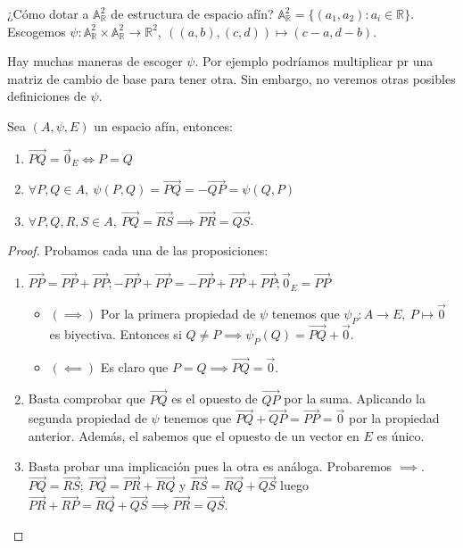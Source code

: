 \documentclass[14pt]{book}
\begin{document}
\begin{ej}
	¿Cómo dotar a $\mathbb{A}^2_\mathbb{R}$ de estructura de espacio afín? $\mathbb{A}^2_\mathbb{R} = \{(a_1, a_2) : a_i \in \mathbb{R}\}$. Escogemos $\psi : \mathbb{A}^2_\mathbb{R} \times \mathbb{A}^2_\mathbb{R} \to \mathbb{R}^2,\ ((a,b), (c,d)) \mapsto (c-a, d-b)$.
	
	Hay muchas maneras de escoger $\psi$. Por ejemplo podríamos multiplicar pr una matriz de cambio de base para tener otra. Sin embargo, no veremos otras posibles definiciones de $\psi$.
\end{ej}

\begin{pro}
	Sea $(A, \psi, E)$ un espacio afín, entonces:
	\begin{enumerate}
		\item $\overrightarrow{P Q} = \overrightarrow{0}_E \iff P = Q$
		\item $\forall P, Q \in A,\ \psi(P, Q) = \overrightarrow{P Q} = - \overrightarrow{Q P} = \psi(Q, P)$
		\item $\forall P, Q, R, S \in A,\ \overrightarrow{PQ} = \overrightarrow{RS} \implies \overrightarrow{PR} = \overrightarrow{QS}$.
	\end{enumerate}
\end{pro}

\begin{proof}
	Probamos cada una de las proposiciones:
	\begin{enumerate}
		\item $\overrightarrow{PP} = \overrightarrow{PP} + \overrightarrow{PP}; -\overrightarrow{PP} + \overrightarrow{PP} = -\overrightarrow{PP} + \overrightarrow{PP} + \overrightarrow{PP}; \overrightarrow{0}_E = \overrightarrow{PP}$
		\begin{itemize}
			\item $(\implies)$ Por la primera propiedad de $\psi$ tenemos que $\psi_P : A \to E,\ P \mapsto \vec{0}$ es biyectiva. Entonces si $Q ≠ P \implies \psi_P(Q) = \overrightarrow{PQ} + \vec{0}$. 
			\item $(\impliedby)$ Es claro que $P = Q \implies \overrightarrow{PQ} = \vec{0}$.
		\end{itemize}
		\item Basta comprobar que $\overrightarrow{PQ}$ es el opuesto de $\overrightarrow{QP}$ por la suma. Aplicando la segunda propiedad de $\psi$ tenemos que $\overrightarrow{PQ} + \overrightarrow{QP} = \overrightarrow{PP} = \vec{0}$ por la propiedad anterior. Además, el sabemos que el opuesto de un vector en $E$ es único.
		\item Basta probar una implicación pues la otra es análoga. Probaremos $\implies$. $\overrightarrow{PQ} = \overrightarrow{RS};\ \overrightarrow{PQ} = \overrightarrow{PR} + \overrightarrow{RQ}$ y $\overrightarrow{RS} = \overrightarrow{RQ} + \overrightarrow{QS}$ luego $\overrightarrow{PR} + \overrightarrow{RP} = \overrightarrow{RQ} + \overrightarrow{QS} \implies \overrightarrow{PR} = \overrightarrow{QS}$.
	\end{enumerate}
\end{proof}
\end{document}
